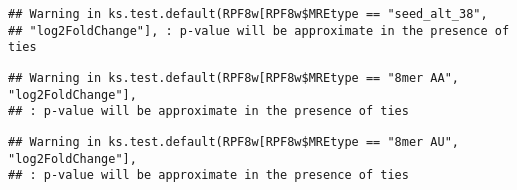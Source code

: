 \documentclass[
]{article}
\newenvironment{Shaded}{\begin{snugshade}}{\end{snugshade}}
\newcommand{\FunctionTok}[1]{\textcolor[rgb]{0.13,0.29,0.53}{\textbf{#1}}}
\newcommand{\NormalTok}[1]{#1}
\newcommand{\OtherTok}[1]{\textcolor[rgb]{0.56,0.35,0.01}{#1}}
\newcommand{\SpecialCharTok}[1]{\textcolor[rgb]{0.81,0.36,0.00}{\textbf{#1}}}
\newcommand{\StringTok}[1]{\textcolor[rgb]{0.31,0.60,0.02}{#1}}
\begin{document}
\begin{verbatim}
## Warning in ks.test.default(RPF8w[RPF8w$MREtype == "seed_alt_38",
## "log2FoldChange"], : p-value will be approximate in the presence of ties
\end{verbatim}

\begin{Shaded}
\end{Shaded}

\begin{verbatim}
## Warning in ks.test.default(RPF8w[RPF8w$MREtype == "8mer AA", "log2FoldChange"],
## : p-value will be approximate in the presence of ties
\end{verbatim}

\begin{Shaded}
\end{Shaded}

\begin{verbatim}
## Warning in ks.test.default(RPF8w[RPF8w$MREtype == "8mer AU", "log2FoldChange"],
## : p-value will be approximate in the presence of ties
\end{verbatim}
\end{document}
